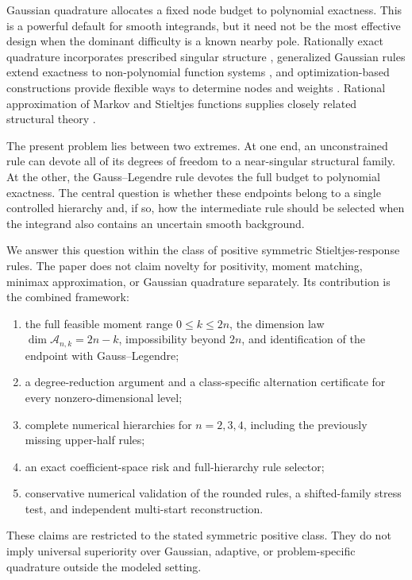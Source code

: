 \documentclass[preprint,12pt]{elsarticle}
\theoremstyle{remark}
\begin{document}
Gaussian quadrature allocates a fixed node budget to polynomial
exactness. This is a powerful default for smooth integrands, but it need
not be the most effective design when the dominant difficulty is a
known nearby pole. Rationally exact quadrature incorporates prescribed
singular structure \cite{gautschi1993}, generalized Gaussian rules extend
exactness to non-polynomial function systems \cite{huybrechs2017}, and
optimization-based constructions provide flexible ways to determine
nodes and weights \cite{keshavarzzadeh2018,glaubitz2020}. Rational
approximation of Markov and Stieltjes functions supplies closely related
structural theory \cite{beckermann2021}.

The present problem lies between two extremes. At one end, an
unconstrained rule can devote all of its degrees of freedom to a
near-singular structural family. At the other, the Gauss--Legendre rule
devotes the full budget to polynomial exactness. The central question is
whether these endpoints belong to a single controlled hierarchy and,
if so, how the intermediate rule should be selected when the integrand
also contains an uncertain smooth background.

We answer this question within the class of positive symmetric
Stieltjes-response rules. The paper does not claim novelty for
positivity, moment matching, minimax approximation, or Gaussian
quadrature separately. Its contribution is the combined framework:
\begin{enumerate}[label=(\roman*)]
\item the full feasible moment range \(0\leq k\leq2n\), the dimension
law \(\dim\mathcal A_{n,k}=2n-k\), impossibility beyond \(2n\), and
identification of the endpoint with Gauss--Legendre;
\item a degree-reduction argument and a class-specific alternation
certificate for every nonzero-dimensional level;
\item complete numerical hierarchies for \(n=2,3,4\), including the
previously missing upper-half rules;
\item an exact coefficient-space risk and full-hierarchy rule selector;
\item conservative numerical validation of the rounded rules, a
shifted-family stress test, and independent multi-start reconstruction.
\end{enumerate}

These claims are restricted to the stated symmetric positive class.
They do not imply universal superiority over Gaussian, adaptive, or
problem-specific quadrature outside the modeled setting.
\end{document}
